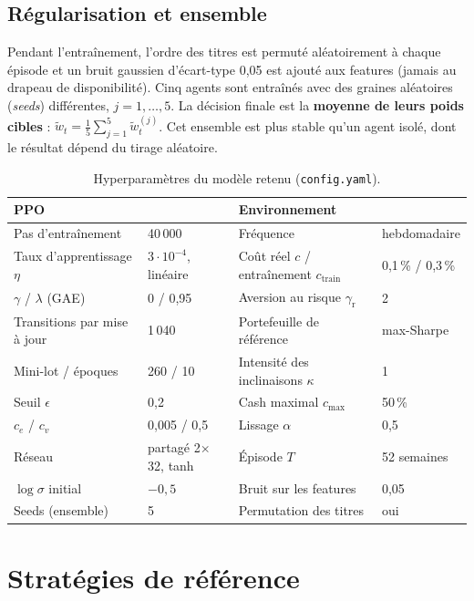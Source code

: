 \documentclass[11pt,a4paper]{article}
\begin{document}
\subsection{Régularisation et ensemble}
Pendant l'entraînement, l'ordre des titres est permuté aléatoirement à chaque épisode et un bruit gaussien
d'écart-type 0,05 est ajouté aux features (jamais au drapeau de disponibilité). Cinq agents sont entraînés avec des
graines aléatoires (\emph{seeds}) différentes, \(j=1,\dots,5\). La décision finale est la \textbf{moyenne de leurs
poids cibles} : \(\tilde w_t=\frac15\sum_{j=1}^{5}\tilde w^{(j)}_t\). Cet ensemble est plus stable qu'un agent
isolé, dont le résultat dépend du tirage aléatoire.

\begin{table}[H]
\centering\small
\caption{Hyperparamètres du modèle retenu (\texttt{config.yaml}).}
\begin{tabular}{@{}llll@{}}
\toprule
\multicolumn{2}{l}{\textbf{PPO}} & \multicolumn{2}{l}{\textbf{Environnement}}\\
\midrule
Pas d'entraînement & 40\,000 & Fréquence & hebdomadaire\\
Taux d'apprentissage \(\eta\) & \(3\cdot10^{-4}\), linéaire & Coût réel \(c\) / entraînement \(c_{\text{train}}\) & 0,1\,\% / 0,3\,\%\\
\(\gamma\) / \(\lambda\) (GAE) & 0 / 0,95 & Aversion au risque \(\gamma_{\text{r}}\) & 2\\
Transitions par mise à jour & 1\,040 & Portefeuille de référence & max-Sharpe\\
Mini-lot / époques & 260 / 10 & Intensité des inclinaisons \(\kappa\) & 1\\
Seuil \(\epsilon\) & 0,2 & Cash maximal \(c_{\max}\) & 50\,\%\\
\(c_e\) / \(c_v\) & 0,005 / 0,5 & Lissage \(\alpha\) & 0,5\\
Réseau & partagé 2\(\times\)32, tanh & Épisode \(T\) & 52 semaines\\
\(\log\sigma\) initial & \(-0{,}5\) & Bruit sur les features & 0,05\\
Seeds (ensemble) & 5 & Permutation des titres & oui\\
\bottomrule
\end{tabular}
\end{table}

\section{Stratégies de référence}\label{sec:benchmarks}
\end{document}
